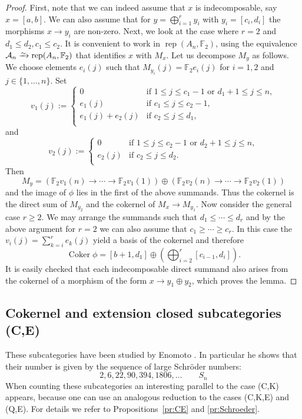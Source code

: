 \documentclass[a4paper]{amsart}
\theoremstyle{plain}
\theoremstyle{definition}
\theoremstyle{remark}
\numberwithin{equation}{section}
\newcommand{\Coker}{\operatorname{Coker}}
\newcommand{\rep}{\operatorname{rep}}
\newcommand{\iso}{\xrightarrow{\raisebox{-.4ex}[0ex][0ex]{$\scriptstyle{\sim}$}}}
\def\A{\mathcal A}
\def\bbF{\mathbb F}
\begin{document}
\begin{proof}
  First, note that we can indeed assume that $x$ is indecomposable,
  say $x=[a,b]$. We can also assume that for $y=\bigoplus_{i=1}^r y_i$
  with $y_i=[c_i,d_i]$ the morphisms $x\to y_i$ are non-zero. Next, we
  look at the case where $r=2$ and $d_1\le d_2, c_1\le c_2$. It is
  convenient to work in $\rep(A_n,\bbF_2)$, using the equivalence
  $\A_n\iso\rep(A_n,\bbF_2)$ that identifies $x$ with $M_x$. Let us
  decompose $M_y$ as follows.  We choose elements $e_i(j)$ such that
  $M_{y_i}(j)=\bbF_2 e_i(j)$ for $i=1,2$ and $j\in
  \{1,\ldots,n\}$. Set
   \[v_1(j):=\begin{cases} 0& \text{if }1\le j\le c_1-1\text{ or } d_1+1\le j \le n,\\
    e_1(j)& \text{if }c_1\le j\le c_2-1,\\
    e_1(j)+e_2(j) &\text{if }c_2\le j \le d_1,\\
   \end{cases}\]
   and
   \[v_2(j):=\begin{cases} 0& \text{if }1\le j\le c_2-1\text{ or } d_2+1\le j \le n,\\
    e_2(j)& \text{if }c_2\le j\le d_2.\\
   \end{cases}\]
Then
\[M_y=(\bbF_2 v_1(n)\to \cdots \to \bbF_2 v_1(1))\oplus (\bbF_2
  v_2(n)\to\cdots\to \bbF_2v_2(1))\] and the image of $\phi$ lies in
the first of the above summands. Thus the cokernel is the direct sum
of $M_{y_2}$ and the cokernel of $M_x\to M_{y_1}$. Now consider the
general case $r\ge 2$. We may arrange the summands such that
$d_1\le \cdots \le d_r$ and by the above argument for $r=2$ we can
also assume that $c_1\ge \cdots\ge c_r$. In this case the
$v_i(j)=\sum_{k=i}^re_k(j)$ yield a basis of the cokernel and therefore
   \[\Coker\phi= [b+1,d_1]\oplus\left(\bigoplus_{i=2}^r[c_{i-1},d_i]\right).\]
   It is easily checked that each indecomposable direct summand  also
   arises from the cokernel of
   a morphism of the form $x\to y_1\oplus y_2$, which proves the lemma.
 \end{proof}

\subsection*{Cokernel and extension closed subcategories (C,E)}

These subcategories have been studied by Enomoto
\cite{En2021,En2022}. In particular he shows that their number is
given by the sequence of large Schröder numbers:
\[ 2, 6, 22, 90, 394, 1806, \ldots\qquad S_n \tag*{$\#(C,E)$}\] When
counting these subcategories an interesting parallel to the case (C,K)
appears, because one can use an analogous reduction to the cases
(C,K,E) and (Q,E). For details we refer to Propositions~\ref{pr:CE}
and \ref{pr:Schroeder}.
\end{document}
